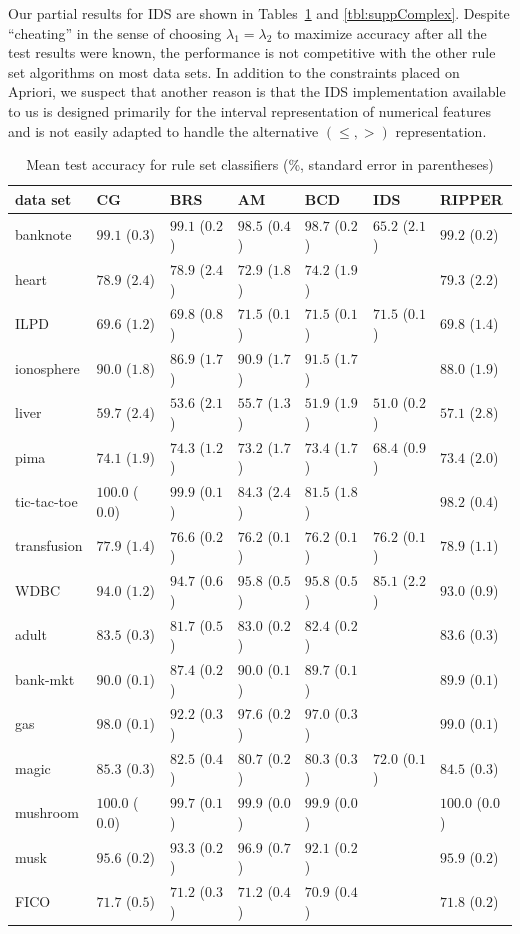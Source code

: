 \documentclass[twoside,11pt]{article}
\begin{document}
Our partial results for IDS are shown in Tables~\ref{tbl:suppRuleAcc} and \ref{tbl:suppComplex}.  Despite ``cheating'' in the sense of choosing $\lambda_1 = \lambda_2$ to maximize accuracy after all the test results were known, the performance is not competitive with the other rule set algorithms on most data sets.  In addition to the constraints placed on Apriori, we suspect that another reason is that the IDS implementation available to us is designed primarily for the interval representation of numerical features and is not easily adapted to handle the alternative $(\leq, >)$ representation.

\begin{table}
\caption{Mean test accuracy for rule set classifiers (\%, standard error in parentheses)}
\label{tbl:suppRuleAcc}
\centering
\begin{tabular}{lllllll}
\toprule
data set&CG&BRS&AM&BCD&IDS&RIPPER\\
\midrule
banknote&$99.1$ ($0.3$)&$99.1$ ($0.2$)&$98.5$ ($0.4$)&$98.7$ ($0.2$)&$65.2$ ($2.1$)&$99.2$ ($0.2$)\\
heart&$78.9$ ($2.4$)&$78.9$ ($2.4$)&$72.9$ ($1.8$)&$74.2$ ($1.9$)&&$79.3$ ($2.2$)\\
ILPD&$69.6$ ($1.2$)&$69.8$ ($0.8$)&$71.5$ ($0.1$)&$71.5$ ($0.1$)&$71.5$ ($0.1$)&$69.8$ ($1.4$)\\
ionosphere&$90.0$ ($1.8$)&$86.9$ ($1.7$)&$90.9$ ($1.7$)&$91.5$ ($1.7$)&&$88.0$ ($1.9$)\\
liver&$59.7$ ($2.4$)&$53.6$ ($2.1$)&$55.7$ ($1.3$)&$51.9$ ($1.9$)&$51.0$ ($0.2$)&$57.1$ ($2.8$)\\
pima&$74.1$ ($1.9$)&$74.3$ ($1.2$)&$73.2$ ($1.7$)&$73.4$ ($1.7$)&$68.4$ ($0.9$)&$73.4$ ($2.0$)\\
tic-tac-toe&$100.0$ ($0.0$)&$99.9$ ($0.1$)&$84.3$ ($2.4$)&$81.5$ ($1.8$)&&$98.2$ ($0.4$)\\
transfusion&$77.9$ ($1.4$)&$76.6$ ($0.2$)&$76.2$ ($0.1$)&$76.2$ ($0.1$)&$76.2$ ($0.1$)&$78.9$ ($1.1$)\\
WDBC&$94.0$ ($1.2$)&$94.7$ ($0.6$)&$95.8$ ($0.5$)&$95.8$ ($0.5$)&$85.1$ ($2.2$)&$93.0$ ($0.9$)\\
\midrule
adult&$83.5$ ($0.3$)&$81.7$ ($0.5$)&$83.0$ ($0.2$)&$82.4$ ($0.2$)&&$83.6$ ($0.3$)\\
bank-mkt&$90.0$ ($0.1$)&$87.4$ ($0.2$)&$90.0$ ($0.1$)&$89.7$ ($0.1$)&&$89.9$ ($0.1$)\\
gas&$98.0$ ($0.1$)&$92.2$ ($0.3$)&$97.6$ ($0.2$)&$97.0$ ($0.3$)&&$99.0$ ($0.1$)\\
magic&$85.3$ ($0.3$)&$82.5$ ($0.4$)&$80.7$ ($0.2$)&$80.3$ ($0.3$)&$72.0$ ($0.1$)&$84.5$ ($0.3$)\\
mushroom&$100.0$ ($0.0$)&$99.7$ ($0.1$)&$99.9$ ($0.0$)&$99.9$ ($0.0$)&&$100.0$ ($0.0$)\\
musk&$95.6$ ($0.2$)&$93.3$ ($0.2$)&$96.9$ ($0.7$)&$92.1$ ($0.2$)&&$95.9$ ($0.2$)\\
FICO&$71.7$ ($0.5$)&$71.2$ ($0.3$)&$71.2$ ($0.4$)&$70.9$ ($0.4$)&&$71.8$ ($0.2$)\\
\bottomrule
\end{tabular}
\end{table}
\end{document}
